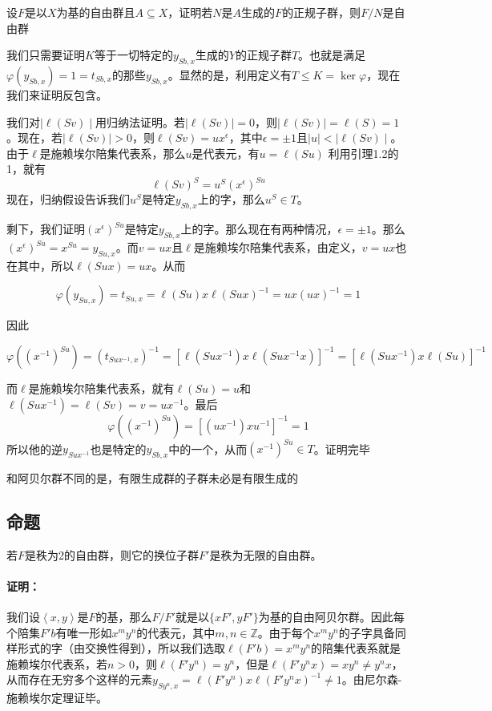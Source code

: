\documentclass[UTF8]{article}
\begin{document}
	
	\begin{framed}
		设$F$是以$X$为基的自由群且$A\subseteq X$，证明若$N$是$A$生成的$F$的正规子群，则$F/N$是自由群
	\end{framed}
	
	我们只需要证明$K$等于一切特定的$y_{Sb,x}$生成的$Y$的正规子群$T$。也就是满足$\varphi(y_{Sb,x}) = 1 = t_{Sb,x}$的那些$y_{Sb,x}$。显然的是，利用定义有$T\leq K = \ker\varphi$，现在我们来证明反包含。
	
	我们对$\mid \ell(Sv)\mid $用归纳法证明。若$\mid \ell(Sv)\mid = 0$，则$\mid \ell(Sv)\mid =  \ell(S)  = 1$。现在，若$\mid \ell(Sv)\mid > 0$，则$\ell(Sv) = ux^\epsilon$，其中$\epsilon = \pm 1$且$\mid u\mid < \mid \ell(Sv)\mid $。由于$\ell$是施赖埃尔陪集代表系，那么$u$是代表元，有$u = \ell(Su)$ 利用引理1.2的1，就有
	$$
		\ell(Sv)^S = u^S(x^\epsilon)^{Su}
	$$
	现在，归纳假设告诉我们$u^S$是特定$y_{Sb,x}$上的字，那么$u^S \in T$。
	
	剩下，我们证明$(x^\epsilon)^{Su}$是特定$y_{Sb,x}$上的字。那么现在有两种情况，$\epsilon = \pm 1$。那么$(x^\epsilon)^{Su} = x^{Su} = y_{Su,x}$。而$v = ux$且$\ell$是施赖埃尔陪集代表系，由定义，$v = ux $也在其中，所以$\ell(Sux) = ux$。从而
	
	$$
	\varphi(y_{Su,x}) = t_{Su,x} = \ell(Su)x\ell(Sux)^{-1} = ux(ux)^{-1} =1
	$$
	
	因此
	
	$$
	\varphi((x^{-1})^{Su}) = (t_{Sux^{-1},x})^{-1} = [\ell(Sux^{-1})x\ell(Sux^{-1}x)]^{-1} = [\ell(Sux^{-1})x\ell(Su)]^{-1}
	$$
	
	而$\ell$是施赖埃尔陪集代表系，就有$\ell(Su) = u$和$\ell(Sux^{-1}) = \ell(Sv) = v = ux^{-1}$。最后
	$$
	\varphi((x^{-1})^{Su}) = [(ux^{-1})xu^{-1}]^{-1} = 1
	$$
	所以他的逆$y_{Sux^{-1}}$也是特定的$y_{Sb,x}$中的一个，从而$(x^{-1})^{Su}\in T$。证明完毕
	
	
	和阿贝尔群不同的是，有限生成群的子群未必是有限生成的
	
	\subsection{命题}
	若$F$是秩为2的自由群，则它的换位子群$F'$是秩为无限的自由群。
	
	\paragraph{证明：}我们设$\left<x,y \right>$是$F$的基，那么$F/F'$就是以$\{xF',yF'\}$为基的自由阿贝尔群。因此每个陪集$F'b$有唯一形如$x^my^n$的代表元，其中$m,n\in\mathbb{Z}$。由于每个$x^my^n$的子字具备同样形式的字（由交换性得到），所以我们选取$\ell(F'b) = x^my^n$的陪集代表系就是施赖埃尔代表系，若$n>0$，则$\ell(F'y^n) = y^n$，但是$\ell(F'y^nx) = xy^n \neq y^nx$，从而存在无穷多个这样的元素$y_{Sy^n,x} = \ell(F'y^n)x\ell(F'y^nx)^{-1}\neq 1$。由尼尔森-施赖埃尔定理证毕。
	
\end{document}

